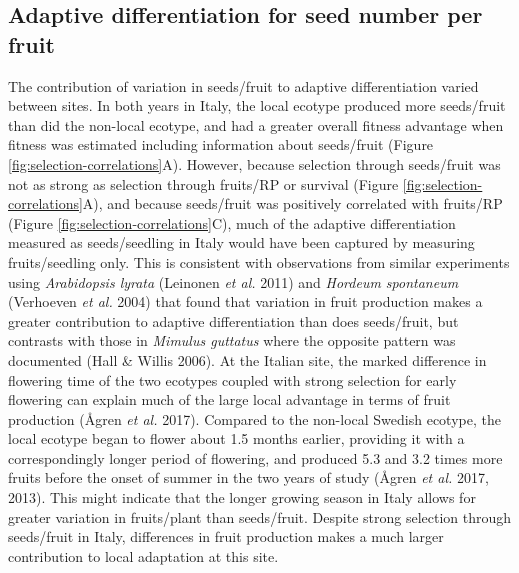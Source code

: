 \documentclass[
]{article}
\begin{document}
\hypertarget{adaptive-differentiation-for-seed-number-per-fruit}{%
\subsection{Adaptive differentiation for seed number per fruit}\label{adaptive-differentiation-for-seed-number-per-fruit}}

The contribution of variation in seeds/fruit to adaptive differentiation varied between sites. In both years in Italy, the local ecotype produced more seeds/fruit than did the non-local ecotype, and had a greater overall fitness advantage when fitness was estimated including information about seeds/fruit (Figure \ref{fig:selection-correlations}A). However, because selection through seeds/fruit was not as strong as selection through fruits/RP or survival (Figure \ref{fig:selection-correlations}A), and because seeds/fruit was positively correlated with fruits/RP (Figure \ref{fig:selection-correlations}C), much of the adaptive differentiation measured as seeds/seedling in Italy would have been captured by measuring fruits/seedling only. This is consistent with observations from similar experiments using \emph{Arabidopsis lyrata} (Leinonen \emph{et al.} 2011) and \emph{Hordeum spontaneum} (Verhoeven \emph{et al.} 2004) that found that variation in fruit production makes a greater contribution to adaptive differentiation than does seeds/fruit, but contrasts with those in \emph{Mimulus guttatus} where the opposite pattern was documented (Hall \& Willis 2006). At the Italian site, the marked difference in flowering time of the two ecotypes coupled with strong selection for early flowering can explain much of the large local advantage in terms of fruit production (Ågren \emph{et al.} 2017). Compared to the non-local Swedish ecotype, the local ecotype began to flower about 1.5 months earlier, providing it with a correspondingly longer period of flowering, and produced 5.3 and 3.2 times more fruits before the onset of summer in the two years of study (Ågren \emph{et al.} 2017, 2013). This might indicate that the longer growing season in Italy allows for greater variation in fruits/plant than seeds/fruit. Despite strong selection through seeds/fruit in Italy, differences in fruit production makes a much larger contribution to local adaptation at this site.
\end{document}
